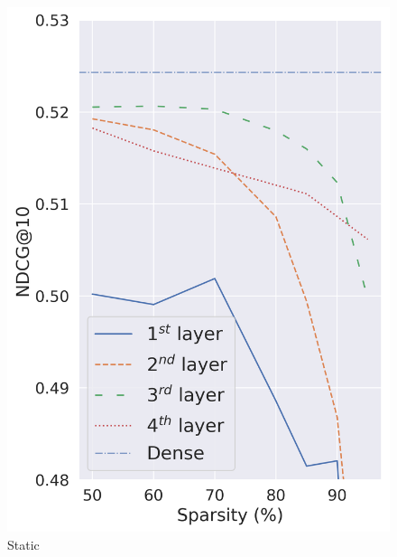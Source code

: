 \begin{figure}[t]
\begin{minipage}[b]{0.5\columnwidth}
\includegraphics[width=\columnwidth]{imgs/static_sensitivity.png}
\centering 
\caption*{\footnotesize{Static}}
\end{minipage}%
\begin{minipage}[b]{0.5\columnwidth}

\end{minipage}
\end{figure}
